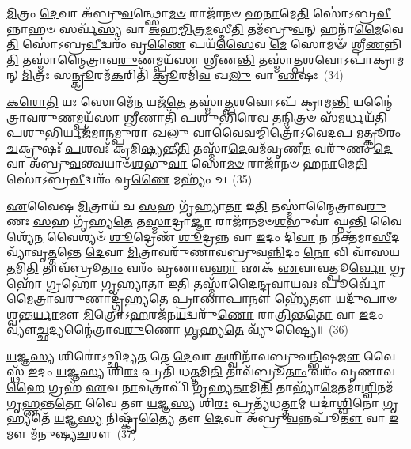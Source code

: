 {\anuvakamend[{\-\ul{𑌸𑍍𑌵}\-\-\ul{𑌦}\-\-\ul{𑌯} 𑌸𑍋𑌮𑌾𑌃॑ \ul{𑌸}\-𑌹𑌾𑌷𑍍𑌟𑌾𑌵𑌿𑍞᳴𑌶𑌤𑌿𑌶𑍍𑌚}]}%

\-\ul{𑌮𑌿}\-𑌤𑍍𑌰𑌂 \ul{𑌦𑍇}\-𑌵𑌾 𑌅᳴𑌬𑍍𑌰𑍁\-\ul{𑌵}\-𑌨𑍍𑌥𑍍𑌸𑍋\-\ul{𑌮}\-\-\ul{𑍞} 𑌰𑌾𑌜𑌾᳴𑌨𑍞 𑌹\-\ul{𑌨𑌾}\-𑌮𑍇\-\ul{𑌤𑌿} 𑌸𑍋॑\-𑌽𑌬𑍍𑌰\-\ul{𑌵𑍀}\-𑌨𑍍𑌨𑌾𑌹𑍞 𑌸𑌰𑍍𑌵᳴\-\ul{𑌸𑍍𑌯} 𑌵𑌾 \ul{𑌅}\-𑌹\-\ul{𑌮𑍍𑌮𑌿}\-𑌤𑍍𑌰\-\ul{𑌮}\-𑌸𑍍𑌮𑍀\-\ul{𑌤𑌿} 𑌤𑌮᳴𑌬𑍍𑌰𑍁\-\ul{𑌵}\-𑌨𑍍 𑌹𑌨𑌾᳴\-\ul{𑌮𑍈}\-𑌵𑍇\-\ul{𑌤𑌿} 𑌸𑍋॑\-𑌽𑌬𑍍𑌰\-\ul{𑌵𑍀}\-𑌦𑍍𑌵𑌰𑌂᳴ 𑌵𑍃\-\ul{𑌣𑍈} 𑌪𑌯᳴\-\ul{𑌸𑍈}\-𑌵 \ul{𑌮𑍇} 𑌸𑍋𑌮𑍟᳴ 𑌶𑍍𑌰𑍀\-\ul{𑌣}\-𑌨𑍍𑌨𑌿\-\ul{𑌤𑌿} 𑌤𑌸𑍍𑌮𑌾॑𑌨𑍍𑌮𑍈𑌤𑍍𑌰𑌾𑌵\-\ul{𑌰𑍁}\-𑌣𑌮𑍍𑌪𑌯᳴𑌸𑌾 𑌶𑍍𑌰𑍀𑌣\-\ul{𑌨𑍍𑌤𑌿} 𑌤𑌸𑍍𑌮𑌾॑\-\ul{𑌤𑍍𑌪}\-𑌶𑌵𑍋\-𑌽𑌪𑌾॑𑌕𑍍𑌰𑌾𑌮𑌨𑍍 \ul{𑌮𑌿}\-𑌤𑍍𑌰𑌃 𑌸\-\ul{𑌨𑍍𑌕𑍍𑌰𑍂}\-𑌰𑌮᳴\-\ul{𑌕}\-𑌰𑌿𑌤𑌿᳴ \ul{𑌕𑍍𑌰𑍂}\-𑌰𑌮𑌿᳴\-\ul{𑌵} 𑌖\-\ul{𑌲𑍁} 𑌵𑌾 \ul{𑌏}\-𑌷𑌃~(34)

\-\ul{𑌕}\-\-\ul{𑌰𑍋}\-\-\ul{𑌤𑌿} 𑌯𑌃 𑌸𑍋𑌮𑍇᳴\-\ul{𑌨} 𑌯𑌜᳴\-\ul{𑌤𑍇} 𑌤𑌸𑍍𑌮𑌾॑\-\ul{𑌤𑍍𑌪}\-𑌶𑌵𑍋\-𑌽𑌪᳴ 𑌕𑍍𑌰𑌾𑌮\-\ul{𑌨𑍍𑌤𑌿} 𑌯𑌨𑍍𑌮𑍈॑𑌤𑍍𑌰𑌾𑌵\-\ul{𑌰𑍁}\-𑌣𑌮𑍍𑌪𑌯᳴𑌸𑌾 \ul{𑌶𑍍𑌰𑍀}\-𑌣𑌾𑌤𑌿᳴ \ul{𑌪}\-𑌶𑍁𑌭𑌿᳴\-\ul{𑌰𑍇}\-𑌵 𑌤\-\ul{𑌨𑍍𑌮𑌿}\-𑌤𑍍𑌰𑍞 𑌸᳴\-\ul{𑌮}\-𑌰𑍍𑌧𑌯᳴𑌤𑌿 \ul{𑌪}\-𑌶𑍁\-\ul{𑌭𑌿}\-𑌰𑍍𑌯𑌜᳴𑌮𑌾𑌨\-\ul{𑌮𑍍𑌪𑍁}\-𑌰𑌾 𑌖\-\ul{𑌲𑍁} 𑌵𑌾𑌵𑍈𑌵\-\ul{𑌮𑍍𑌮𑌿}\-𑌤𑍍𑌰𑍋᳴\-𑌽\-\ul{𑌵𑍇}\-𑌦\-\ul{𑌪} 𑌮\-\ul{𑌤𑍍𑌕𑍍𑌰𑍂}\-𑌰𑌂 \ul{𑌚}\-𑌕𑍍𑌰𑍁𑌷𑌃᳴ \ul{𑌪}\-𑌶𑌵𑌃᳴ 𑌕𑍍𑌰𑌮𑌿\-\ul{𑌷𑍍𑌯}\-𑌨𑍍𑌤𑍀\-\ul{𑌤𑌿} 𑌤𑌸𑍍𑌮𑌾᳴\-\ul{𑌦𑍇}\-𑌵𑌮᳴𑌵𑍃𑌣𑍀\-\ul{𑌤} 𑌵𑌰𑍁᳴𑌣𑌂 \ul{𑌦𑍇}\-𑌵𑌾 𑌅᳴𑌬𑍍𑌰𑍁\-\ul{𑌵}\-𑌨𑍍𑌤𑍍𑌵𑌯𑌾𑍞᳴\-\ul{𑌶}\-𑌭𑍁\-\ul{𑌵𑌾} 𑌸𑍋\-\ul{𑌮}\-\-\ul{𑍞} 𑌰𑌾𑌜𑌾᳴𑌨𑍞 𑌹\-\ul{𑌨𑌾}\-𑌮𑍇\-\ul{𑌤𑌿} 𑌸𑍋॑\-𑌽𑌬𑍍𑌰\-\ul{𑌵𑍀}\-𑌦𑍍𑌵𑌰𑌂᳴ 𑌵𑍃\-\ul{𑌣𑍈} 𑌮𑌹𑍍𑌯𑌂᳴ 𑌚~(35)

\-\ul{𑌏}\-𑌵𑍈𑌷 \ul{𑌮𑌿}\-𑌤𑍍𑌰𑌾𑌯᳴ 𑌚 \ul{𑌸}\-𑌹 𑌗𑍃᳴𑌹𑍍𑌯𑌾\-\ul{𑌤𑌾} 𑌇\-\ul{𑌤𑌿} 𑌤𑌸𑍍𑌮𑌾॑𑌨𑍍𑌮𑍈𑌤𑍍𑌰𑌾𑌵\-\ul{𑌰𑍁}\-𑌣𑌃 \ul{𑌸}\-𑌹 𑌗𑍃᳴𑌹𑍍𑌯\-\ul{𑌤𑍇} 𑌤\-\ul{𑌸𑍍𑌮𑌾}\-𑌦𑍍𑌰𑌾\-\ul{𑌜𑍍𑌞𑌾} 𑌰𑌾𑌜𑌾᳴𑌨𑌮𑍞\-\ul{𑌶}\-𑌭𑍁𑌵𑌾॑ 𑌘𑍍𑌨\-\ul{𑌨𑍍𑌤𑌿} 𑌵𑍈𑌶𑍍𑌯𑍇᳴\-\ul{𑌨} 𑌵𑍈𑌶𑍍𑌯𑍞᳴ \ul{𑌶𑍂}\-𑌦𑍍𑌰𑍇𑌣᳴ \ul{𑌶𑍂}\-𑌦𑍍𑌰𑌨𑍍𑌨 𑌵𑌾 \ul{𑌇}\-𑌦𑌂 𑌦𑌿\-\ul{𑌵𑌾} 𑌨 𑌨𑌕𑍍𑌤᳴𑌮𑌾\-\ul{𑌸𑍀}\-𑌦𑌵𑍍𑌯𑌾᳴𑌵𑍃\-\ul{𑌤𑍍𑌤}\-𑌨𑍍𑌤𑍇 \ul{𑌦𑍇}\-𑌵𑌾 \ul{𑌮𑌿}\-𑌤𑍍𑌰𑌾𑌵𑌰𑍁᳴𑌣𑌾𑌵𑌬𑍍𑌰𑍁𑌵\-\ul{𑌨𑍍𑌨𑌿}\-𑌦𑌂 \ul{𑌨𑍋} 𑌵𑌿 𑌵𑌾᳴𑌸𑌯\-\ul{𑌤}\-𑌮𑌿\-\ul{𑌤𑌿} 𑌤𑌾𑌵᳴𑌬𑍍𑌰𑍂\-\ul{𑌤𑌾𑌂} 𑌵𑌰𑌂᳴ 𑌵𑍃𑌣𑌾𑌵\-\ul{𑌹𑌾} 𑌏𑌕᳴ \ul{𑌏}\-𑌵𑌾𑌵𑌤𑍍𑌪𑍂\-\ul{𑌰𑍍𑌵𑍋} 𑌗𑍍𑌰𑌹𑍋᳴ 𑌗𑍍𑌰𑌹𑍋 𑌗𑍃𑌹𑍍𑌯𑌾\-\ul{𑌤𑌾} 𑌇\-\ul{𑌤𑌿} 𑌤𑌸𑍍𑌮𑌾᳴𑌦𑍈𑌨𑍍𑌦𑍍𑌰𑌵𑌾\-\ul{𑌯}\-𑌵𑌃 𑌪𑍂𑌰𑍍𑌵𑍋᳴ 𑌮𑍈𑌤𑍍𑌰𑌾𑌵\-\ul{𑌰𑍁}\-𑌣𑌾𑌦𑍍𑌗𑍃᳴𑌹𑍍𑌯𑌤𑍇 𑌪𑍍𑌰𑌾𑌣𑌾\-\ul{𑌪𑌾}\-𑌨𑍗 𑌹𑍍𑌯𑍇᳴𑌤𑍗 𑌯𑌦𑍁᳴𑌪𑌾𑍞𑌶𑍍𑌵𑌨𑍍𑌤\-\ul{𑌰𑍍𑌯𑌾}\-𑌮𑍗 \ul{𑌮𑌿}\-𑌤𑍍𑌰𑍋\-𑌽\-\ul{𑌹}\-𑌰𑌜᳴𑌨\-\ul{𑌯}\-𑌦𑍍𑌵𑌰𑍁᳴\-\ul{𑌣𑍋} 𑌰𑌾\-\ul{𑌤𑍍𑌰𑌿}\-𑌨𑍍𑌤\-\ul{𑌤𑍋} 𑌵𑌾 \ul{𑌇}\-𑌦𑌂 𑌵𑍍𑌯𑍗॑\-\ul{𑌚𑍍𑌛}\-𑌦𑍍𑌯𑌨𑍍𑌮𑍈॑𑌤𑍍𑌰𑌾𑌵\-\ul{𑌰𑍁}\-𑌣𑍋 \ul{𑌗𑍃}\-𑌹𑍍𑌯\-\ul{𑌤𑍇} 𑌵𑍍𑌯𑍁᳴𑌷𑍍𑌟𑍍𑌯𑍈॥~(36)

{\anuvakamend[{\-\ul{𑌏}\-𑌷 𑌚𑍈॑𑌨𑍍𑌦𑍍𑌰𑌵𑌾\-\ul{𑌯}\-𑌵𑍋 𑌦𑍍𑌵𑌾𑌵𑌿𑍞᳴𑌶𑌤𑌿𑌶𑍍𑌚}]}%

\-\ul{𑌯}\-𑌜𑍍𑌞\-\ul{𑌸𑍍𑌯} 𑌶𑌿𑌰𑍋॑\-𑌽𑌚𑍍𑌛𑌿𑌦𑍍𑌯\-\ul{𑌤} 𑌤𑍇 \ul{𑌦𑍇}\-𑌵𑌾 \ul{𑌅}\-𑌶𑍍𑌵𑌿𑌨𑌾᳴𑌵𑌬𑍍𑌰𑍁𑌵\-\ul{𑌨𑍍𑌭𑌿}\-𑌷\-\ul{𑌜𑍗} 𑌵𑍈 𑌸𑍍𑌥᳴ \ul{𑌇}\-𑌦𑌂 \ul{𑌯}\-𑌜𑍍𑌞\-\ul{𑌸𑍍𑌯} 𑌶𑌿\-\ul{𑌰𑌃} 𑌪𑍍𑌰𑌤𑌿᳴ 𑌧\-\ul{𑌤𑍍𑌤}\-𑌮𑌿\-\ul{𑌤𑌿} 𑌤𑌾𑌵᳴𑌬𑍍𑌰𑍂\-\ul{𑌤𑌾𑌂} 𑌵𑌰𑌂᳴ 𑌵𑍃𑌣𑌾𑌵\-\ul{𑌹𑍈} 𑌗𑍍𑌰𑌹᳴ \ul{𑌏}\-𑌵 \ul{𑌨𑌾}\-𑌵𑌤𑍍𑌰𑌾𑌪𑌿᳴ 𑌗𑍃𑌹𑍍𑌯\-\ul{𑌤𑌾}\-𑌮𑌿\-\ul{𑌤𑌿} 𑌤𑌾𑌭𑍍𑌯𑌾᳴\-\ul{𑌮𑍇}\-𑌤𑌮𑌾॑\-\ul{𑌶𑍍𑌵𑌿}\-𑌨𑌮᳴𑌗𑍃\-\ul{𑌹𑍍𑌣}\-𑌨𑍍𑌤\-\ul{𑌤𑍋} 𑌵𑍈 𑌤𑍗 \ul{𑌯}\-𑌜𑍍𑌞\-\ul{𑌸𑍍𑌯} 𑌶𑌿\-\ul{𑌰𑌃} 𑌪𑍍𑌰𑌤𑍍𑌯᳴𑌧\-\ul{𑌤𑍍𑌤𑌾}\-𑌮𑍍 𑌯𑌦𑌾॑\-\ul{𑌶𑍍𑌵𑌿}\-𑌨𑍋 \ul{𑌗𑍃}\-𑌹𑍍𑌯𑌤𑍇᳴ \ul{𑌯}\-𑌜𑍍𑌞\-\ul{𑌸𑍍𑌯} 𑌨𑌿𑌷𑍍𑌕𑍃᳴\-\ul{𑌤𑍍𑌯𑍈} 𑌤𑍗 \ul{𑌦𑍇}\-𑌵𑌾 𑌅᳴𑌬𑍍𑌰𑍁\-\ul{𑌵}\-𑌨𑍍𑌨𑌪𑍂᳴\-\ul{𑌤𑍗} 𑌵𑌾 \ul{𑌇}\-𑌮𑍗 𑌮᳴𑌨𑍁𑌷𑍍𑌯\-\ul{𑌚}\-𑌰𑍗~(37)

